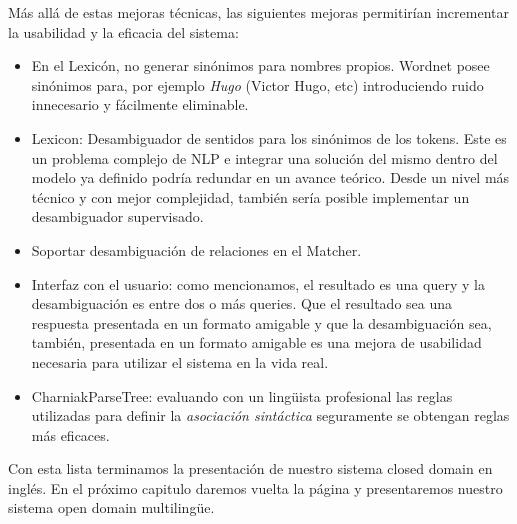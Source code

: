 Más allá de estas mejoras técnicas, las siguientes mejoras permitirían incrementar la usabilidad y la eficacia del sistema:

\begin{itemize}
\item En el Lexicón, no generar sinónimos para nombres propios. Wordnet posee sinónimos para, por ejemplo \textit{Hugo} (Victor Hugo, etc) introduciendo ruido innecesario y fácilmente eliminable.
\item Lexicon: Desambiguador de sentidos para los sinónimos de los tokens. Este es un problema complejo de NLP e integrar una solución del mismo dentro del modelo ya definido podría redundar en un avance teórico. Desde un nivel más técnico y con mejor complejidad, también sería posible implementar un desambiguador supervisado.
\item Soportar desambiguación de relaciones en el Matcher.
\item Interfaz con el usuario: como mencionamos, el resultado es una query y la desambiguación es entre dos o más queries. Que el resultado sea una respuesta presentada en un formato amigable y que la desambiguación sea, también, presentada en un formato amigable es una mejora de usabilidad necesaria para utilizar el sistema en la vida real.
\item CharniakParseTree: evaluando con un lingüista profesional las reglas utilizadas para definir la \textit{asociación sintáctica} seguramente se obtengan reglas más eficaces.
\end{itemize}

Con esta lista terminamos la presentación de nuestro sistema closed domain en inglés. En el próximo capitulo daremos vuelta la página y presentaremos nuestro sistema open domain multilingüe.

